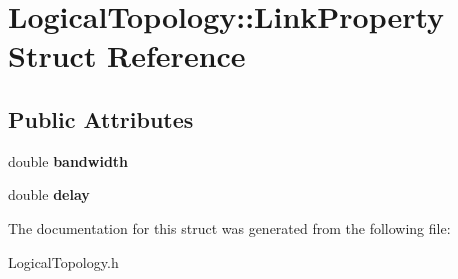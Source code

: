 \hypertarget{structLogicalTopology_1_1LinkProperty}{\section{\-Logical\-Topology\-:\-:\-Link\-Property \-Struct \-Reference}
\label{structLogicalTopology_1_1LinkProperty}
}
\subsection*{\-Public \-Attributes}
\begin{DoxyCompactItemize}
\item 
\hypertarget{structLogicalTopology_1_1LinkProperty_a410b22cc75f1eb45bf49e9e03c168ab8}{double {\bfseries bandwidth}}\label{structLogicalTopology_1_1LinkProperty_a410b22cc75f1eb45bf49e9e03c168ab8}

\item 
\hypertarget{structLogicalTopology_1_1LinkProperty_a821e1e1d64e80780a996d973a68ea4b9}{double {\bfseries delay}}\label{structLogicalTopology_1_1LinkProperty_a821e1e1d64e80780a996d973a68ea4b9}

\end{DoxyCompactItemize}


\-The documentation for this struct was generated from the following file\-:\begin{DoxyCompactItemize}
\item 
\-Logical\-Topology.\-h\end{DoxyCompactItemize}
